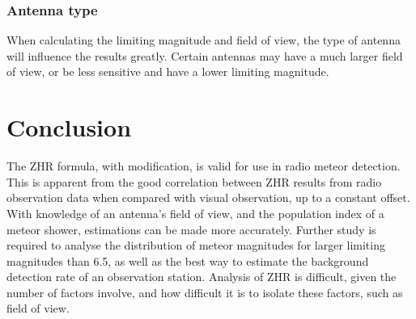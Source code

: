 \subsubsection{Antenna type}
When calculating the limiting magnitude and field of view, the type of antenna will influence the results greatly. Certain antennas may have a much larger field of view, or be less sensitive and have a lower limiting magnitude. 
\section{Conclusion}
The ZHR formula, with modification, is valid for use in radio meteor detection. This is apparent from the good correlation between ZHR results from radio observation data when compared with visual observation, up to a constant offset. With knowledge of an antenna's field of view, and the population index of a meteor shower, estimations can be made more accurately. Further study is required to analyse the distribution of meteor magnitudes for larger limiting magnitudes than 6.5, as well as the best way to estimate the background detection rate of an observation station. Analysis of ZHR is difficult, given the number of factors involve, and how difficult it is to isolate these factors, such as field of view.